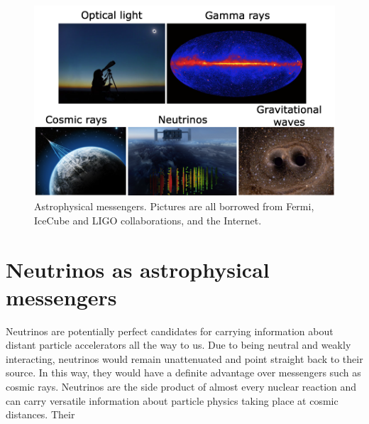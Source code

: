 
\begin{figure}
\centering
\includegraphics[width=1.0\textwidth]{figures/messengers_2.png}
\caption{Astrophysical messengers. Pictures are all borrowed from Fermi, IceCube and LIGO collaborations, and the Internet.}
\label{messengers}
\end{figure}

\section{Neutrinos as astrophysical messengers}

Neutrinos are potentially perfect candidates for carrying information about distant particle accelerators all the way to us. Due to being neutral and weakly interacting, neutrinos would remain unattenuated and point straight back to their source. In this way, they would have a definite advantage over messengers such as cosmic rays. Neutrinos are the side product of almost every nuclear reaction and can carry versatile information about particle physics taking place at cosmic distances. Their  

